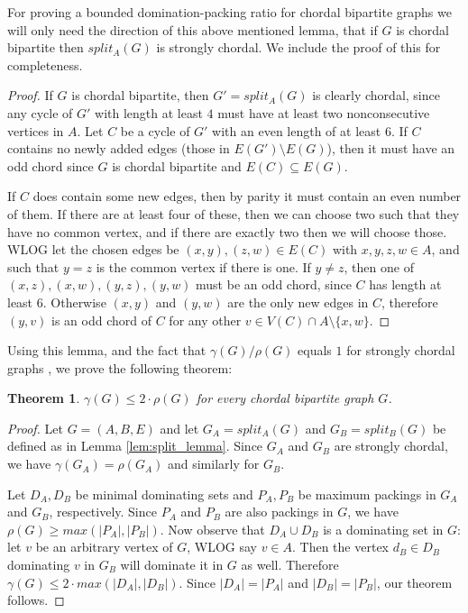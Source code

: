 \documentclass[a4paper, 12pt]{article}
\newtheorem{theorem}{Theorem}[section]
\begin{document}
    For proving a bounded domination-packing ratio for chordal bipartite graphs we will only need the direction of this above mentioned lemma, that if $G$ is chordal bipartite then $split_A(G)$ is strongly chordal. We include the proof of this for completeness.

\begin{proof}
    If $G$ is chordal bipartite, then $G' = split_A(G)$ is clearly chordal, since any cycle of $G'$ with length at least $4$ must have at least two nonconsecutive vertices in $A$. Let $C$ be a cycle of $G'$ with an even length of at least $6$. If $C$ contains no newly added edges (those in $E(G')\setminus E(G)$), then it must have an odd chord since $G$ is chordal bipartite and $E(C) \subseteq E(G)$.
    
    If $C$ does contain some new edges, then by parity it must contain an even number of them. If there are at least four of these, then we can choose two such that they have no common vertex, and if there are exactly two then we will choose those. WLOG let the chosen edges be $(x,y), (z,w) \in E(C)$ with $x,y,z,w \in A$, and such that $y = z$ is the common vertex if there is one. If $y\not=z$, then one of $(x,z), (x,w), (y,z), (y,w)$ must be an odd chord, since $C$ has length at least $6$. Otherwise $(x,y)$ and $(y, w)$ are the only new edges in $C$, therefore $(y, v)$ is an odd chord of $C$ for any other $v \in V(C) \cap A \setminus\{ x,w\}$.
\end{proof}

Using this lemma, and the fact that $\gamma(G)/\rho(G)$ equals $1$ for strongly chordal graphs \cite{Farber84}, we prove the following theorem:

\newpage

\begin{theorem}
    $\gamma(G) \leq 2\cdot\rho(G)$ for every chordal bipartite graph $G$.
\end{theorem}

\begin{proof}
    Let $G = (A, B, E)$ and let $G_A=split_A(G)$ and $G_B = split_B(G)$ be defined as in Lemma \ref{lem:split_lemma}. Since $G_A$ and $G_B$ are strongly chordal, we have $\gamma(G_A) = \rho(G_A)$ and similarly for $G_B$. 
    
    Let $D_A, D_B$ be minimal dominating sets and $P_A, P_B$ be maximum packings in $G_A$ and $G_B$, respectively. Since $P_A$ and $P_B$ are also packings in $G$, we have $\rho(G) \geq max(|P_A|, |P_B|)$. Now observe that $D_A \cup D_B$ is a dominating set in $G$: let $v$ be an arbitrary vertex of $G$, WLOG say $v \in A$. Then the vertex $d_B \in D_B$ dominating $v$ in $G_B$ will dominate it in $G$ as well. Therefore $\gamma(G) \leq 2\cdot max(|D_A|, |D_B|)$. Since $|D_A| = |P_A|$ and $|D_B| = |P_B|$, our theorem follows.
\end{proof}
\end{document}
